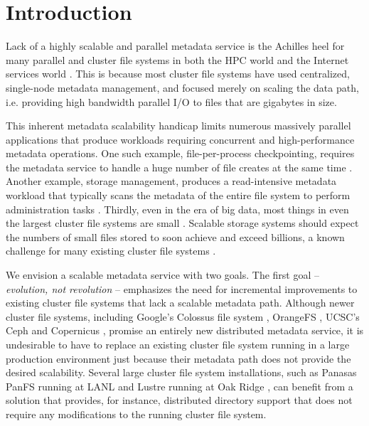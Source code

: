 \section{Introduction}
Lack of a highly scalable and parallel metadata service is the
Achilles heel for many parallel and cluster file systems in both the HPC world
\cite{hpcs-io:2008, hecfsio:tr06} and the Internet services world \cite{HDFS}.
This is because most cluster file systems have used centralized, single-node
metadata management, and focused merely on scaling the data path,
i.e. providing high bandwidth parallel I/O to files that are gigabytes in size.


This inherent metadata scalability handicap limits numerous massively parallel
applications that produce workloads
requiring concurrent and high-performance metadata operations.
One such example, file-per-process checkpointing, requires the metadata service to
handle a huge number of file creates at the same time \cite{PLFS}.
Another example, storage management, produces a read-intensive metadata workload
that typically scans the metadata of the entire file system to perform
administration tasks \cite{filemgmt-ucsc, magellan-ucsc}.
Thirdly, even in the era of big data,
most things in even the largest cluster file systems are small
\cite{Dayal, brent13}.
Scalable storage systems should expect the numbers of small files stored
to soon achieve and exceed billions,
a known challenge for many existing cluster file systems \cite{GIGA11}.

We envision a scalable metadata service with two goals.
The first goal -- \textit{evolution, not revolution} -- emphasizes the need for
incremental improvements to existing cluster file systems that lack a
scalable metadata path.
Although newer cluster file systems, including Google's Colossus file system
\cite{50mfiles-in-googlefs:fikes10}, OrangeFS \cite{OrangeFS}, UCSC's Ceph \cite{ceph:weil06} and 
Copernicus \cite{sfs-ucsc}, promise an entirely new distributed metadata
service, it is undesirable to have to replace an existing cluster file system
running in a large production environment
just because their metadata path does not provide the desired scalability.
Several large cluster file system installations, such as Panasas PanFS running
at LANL \cite{panfs:welch08} and Lustre running at Oak Ridge
\cite{shipman2010, wang09}, can benefit from a solution that provides,
for instance, distributed directory support
that does not require any modifications to the running cluster file system.

